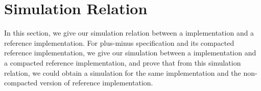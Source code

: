 
\section{Simulation Relation}
\label{sec:simulation relation}

In this section, we give our simulation relation between a implementation and a reference implementation. For plus-minus specification and its compacted reference implementation, we give our simulation between a implementation and a compacted reference implementation, and prove that from this simulation relation, we could obtain a simulation for the same implementation and the non-compacted version of reference implementation. 

 



